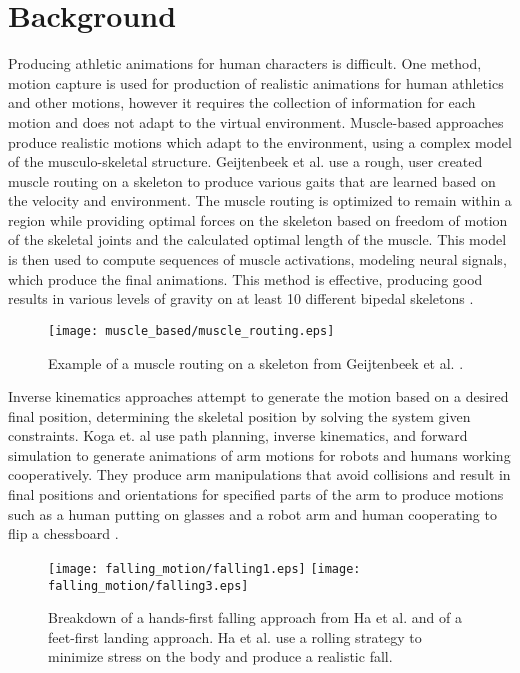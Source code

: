 \documentclass[landscape,26pt]{sciposter}
\begin{document}
	\hfill
\begin{minipage}[t]{17in}
	\section*{Background}
		Producing athletic animations for human characters is difficult.  One method, motion capture is used for production of realistic animations for human athletics and other motions, however it requires the collection of information for each motion and does not adapt to the virtual environment.  Muscle-based approaches produce realistic motions which adapt to the environment, using a complex model of the musculo-skeletal structure.  Geijtenbeek et al. use a rough, user created muscle routing on a skeleton to produce various gaits that are learned based on the velocity and environment.  The muscle routing is optimized to remain within a region while providing optimal forces on the skeleton based on freedom of motion of the skeletal joints and the calculated optimal length of the muscle.  This model is then used to compute sequences of muscle activations, modeling neural signals, which produce the final animations.  This method is effective, producing good results in various levels of gravity on at least 10 different bipedal skeletons \cite{muscle_based_bipeds}.

		\begin{figure}
			\centering
			\texttt{[image: muscle\_based/muscle\_routing.eps]}
			\caption{Example of a muscle routing on a skeleton from Geijtenbeek et al. \cite{muscle_based_bipeds}.}
		\end{figure}
		
		Inverse kinematics approaches attempt to generate the motion based on a desired final position, determining the skeletal position by solving the system given constraints.  Koga et. al use path planning, inverse kinematics, and forward simulation to generate animations of arm motions for robots and humans working cooperatively.  They produce arm manipulations that avoid collisions and result in final positions and orientations for specified parts of the arm to produce motions such as a human putting on glasses and a robot arm and human cooperating to flip a chessboard \cite{motion_intentions}.  
		
		\begin{figure}
			\centering
			\texttt{[image: falling\_motion/falling1.eps]}
			\hspace{0.1\columnwidth}
			\texttt{[image: falling\_motion/falling3.eps]}
			\caption{Breakdown of a hands-first falling approach from Ha et al. \cite{falling_landing} and of a feet-first landing approach.  Ha et al. use a rolling strategy to minimize stress on the body and produce a realistic fall.}
		\end{figure}
		

\end{minipage}
\end{document}
